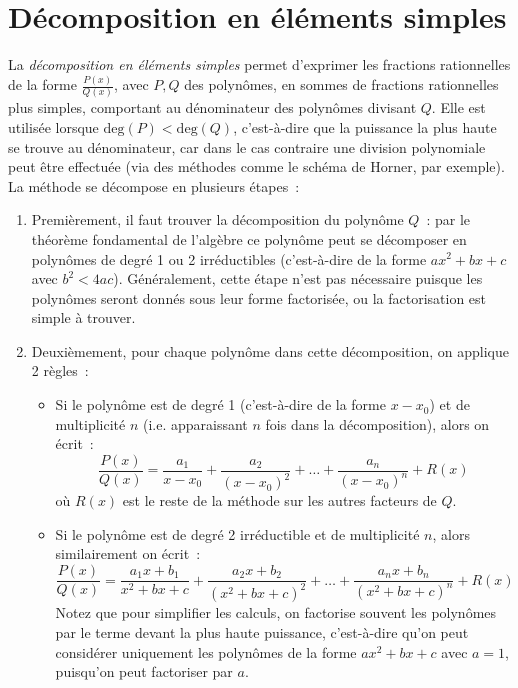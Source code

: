 \documentclass{article}
\begin{document}
\break

\appendix
\section{Décomposition en éléments simples}
La \emph{décomposition en éléments simples} permet d'exprimer les fractions rationnelles de la forme $\frac{P(x)}{Q(x)}$, avec $P, Q$ des polynômes, en sommes de fractions rationnelles plus simples, comportant au dénominateur des polynômes divisant $Q$. Elle est utilisée lorsque $\mathrm{deg}(P) < \mathrm{deg}(Q)$, c'est-à-dire que la puissance la plus haute se trouve au dénominateur, car dans le cas contraire une division polynomiale peut être effectuée (via des méthodes comme le schéma de Horner, par exemple).
La méthode se décompose en plusieurs étapes~:
\begin{enumerate}
    \item Premièrement, il faut trouver la décomposition du polynôme $Q$~: par le théorème fondamental de l'algèbre ce polynôme peut se décomposer en polynômes de degré 1 ou 2 irréductibles (c'est-à-dire de la forme $ax^2 + bx + c$ avec $b^2 < 4ac$). Généralement, cette étape n'est pas nécessaire puisque les polynômes seront donnés sous leur forme factorisée, ou la factorisation est simple à trouver.
    
    \item Deuxièmement, pour chaque polynôme dans cette décomposition, on applique 2 règles~:
    \begin{itemize}
        \item Si le polynôme est de degré 1 (c'est-à-dire de la forme $x - x_0$) et de multiplicité $n$ (i.e. apparaissant $n$ fois dans la décomposition), alors on écrit~:
        \[
        \frac{P(x)}{Q(x)} = \frac{a_1}{x-x_0} + \frac{a_2}{(x-x_0)^2} + \ldots + \frac{a_n}{(x-x_0)^n} + R(x)
        \]
        où $R(x)$ est le reste de la méthode sur les autres facteurs de $Q$.
        \item Si le polynôme est de degré 2 irréductible et de multiplicité $n$, alors similairement on écrit~:
        \[
        \frac{P(x)}{Q(x)} = \frac{a_1x + b_1}{x^2 + bx + c} + \frac{a_2x + b_2}{(x^2 + bx + c)^2} + \ldots + \frac{a_nx + b_n}{(x^2 + bx + c)^n} + R(x)
        \]
        Notez que pour simplifier les calculs, on factorise souvent les polynômes par le terme devant la plus haute puissance, c'est-à-dire qu'on peut considérer uniquement les polynômes de la forme $ax^2 + bx + c$ avec $a = 1$, puisqu'on peut factoriser par $a$.
    \end{itemize}
\end{enumerate}
\end{document}
